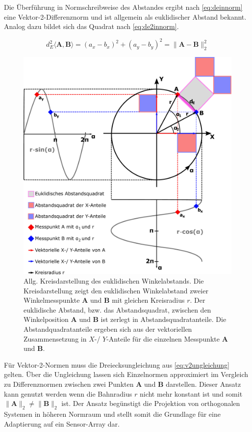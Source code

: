 \clearpage


Die Überführung in Normschreibweise des Abstandes ergibt nach \autoref{eq:deinnorm} eine Vektor-2-Differenznorm und ist allgemein als euklidischer Abstand bekannt. Analog dazu bildet sich das Quadrat nach \autoref{eq:de2innorm}.


\begin{equation}\label{eq:de2innorm}
d_E^2\langle\mathbf{A},\mathbf{B}\rangle = (a_x - b_x)^2 + (a_y - b_y)^2 = \|\mathbf{A} - \mathbf{B}\|_2^2
\end{equation}

\vspace{5mm}
\begin{figure}[bph]
	\centering
	\includegraphics[width=0.7\linewidth]{chapters/images/2-Grundlagen/Kreisdarstellung_Winkelabstand}
	\caption[Allg. Kreisdarstellung des euklidischen Winkelabstands]{Allg. Kreisdarstellung des euklidischen 
		Winkelabstands. Die Kreisdarstellung zeigt den euklidischen Winkelabstand zweier Winkelmesspunkte $\mathbf{A}$ 
		und $\mathbf{B}$ mit gleichen Kreisradius $r$. Der euklidische Abstand, bzw. das Abstandsquadrat, zwischen den 
		Winkelposition $\mathbf{A}$ und $\mathbf{B}$ ist zerlegt in Abstandsquadratanteile. Die Abstandquadratanteile 
		ergeben sich aus der vektoriellen Zusammensetzung in $X$-/ $Y$-Anteile für die einzelnen Messpunkte 
		$\mathbf{A}$ und $\mathbf{B}$.}
	\label{fig:kreisdarstellungwinkelabstand}
\end{figure}


\clearpage


Für Vektor-2-Normen muss die Dreiecksungleichung aus \autoref{eq:v2ungleichung} \cite{Plum2012}\cite{vandeGeijn2014} gelten. Über die Ungleichung lassen sich Einzelnormen approximiert im Vergleich zu Differenznormen zwischen zwei Punkten $\mathbf{A}$ und $\mathbf{B}$ darstellen. Dieser Ansatz kann genutzt werden wenn die Bahnradius $r$ nicht mehr konstant ist und somit $\|\mathbf{A}\|_2 \ne \|\mathbf{B}\|_2$ ist. Der Ansatz begünstigt die Projektion von orthogonalen Systemen in höheren Normraum \cite{Plum2012} und stellt somit die Grundlage für eine Adaptierung auf ein Sensor-Array dar.


